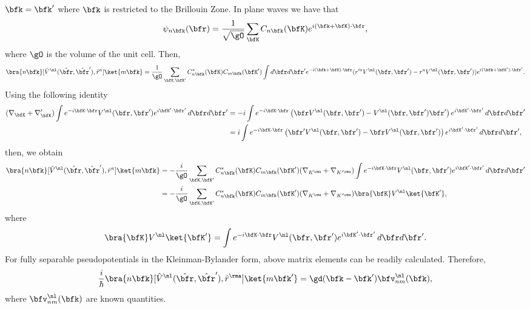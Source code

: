 $\bfk=\bfk'$ where $\bfk$ is restricted to the Brillouin Zone.
In plane waves we have that
\begin{align}\label{cn3}
\psi_{n\bfk}(\bfr)=\frac{1}{\sqrt{\gO}}
\sum_{\bfK} C_{n\bfk}(\bfK)e^{i(\bfk+\bfK)\cdot\bfr}
,
\end{align}
where $\gO$ is the volume of the unit cell.
Then,
\begin{align}\label{cn4}
\bra{n\bfk}[\hat V^\nl(\hat\bfr,\hat\bfr'),\hat r^a]\ket{m\bfk}
&=
\frac{1}{\gO}
\sum_{\bfK,\bfK'} 
C^*_{n\bfk}(\bfK) 
C_{m\bfk}(\bfK')
\int d\bfr d\bfr' 
e^{-i(\bfk+\bfK)\cdot \bfr}
 ( 
r'^a V^\nl(\bfr,\bfr')
- 
r^aV^\nl(\bfr,\bfr')
) 
e^{i(\bfk+\bfK')\cdot \bfr'}
.
\nonumber\\
\end{align} 
Using the following identity 
\begin{align}\label{cn51}
(\nabla_\bfK+\nabla_\bfK')
\int e^{-i\bfK\cdot\bfr}
V^\nl(\bfr,\bfr')
e^{i\bfK'\cdot\bfr'}
\,d\bfr d\bfr'
&=
-i
\int e^{-i\bfK\cdot\bfr}
\left(
\bfr
V^\nl(\bfr,\bfr')
-
V^\nl(\bfr,\bfr')
\bfr'
\right)
e^{i\bfK'\cdot\bfr'}
\,d\bfr d\bfr'
\nonumber\\
&=
i
\int e^{-i\bfK\cdot\bfr}
\left(
\bfr'
V^\nl(\bfr,\bfr')
-
\bfr
 V^\nl(\bfr,\bfr')
\right)
e^{i\bfK'\cdot\bfr'}
\,d\bfr d\bfr'
,
\nonumber\\
\end{align}
then, we obtain
\begin{align}\label{cn52}
\bra{n\bfk}[\hat V^\nl(\hat\bfr,\hat\bfr'),\hat r^a]\ket{m\bfk}
&=
-\frac{i}{\gO}
\sum_{\bfK,\bfK'}
C^*_{n\bfk}(\bfK)
C_{m\bfk}(\bfK')
(\nabla_{K^\rma}+\nabla_{K'^\rma})
\int e^{-i\bfK\cdot\bfr}
V^\nl(\bfr,\bfr')
e^{i\bfK'\cdot\bfr'}
\,d\bfr d\bfr'
\nonumber\\
&=
-\frac{i}{\gO}
\sum_{\bfK,\bfK'}
C^*_{n\bfk}(\bfK)
C_{m\bfk}(\bfK')
(\nabla_{K^\rma}+\nabla_{K'^\rma})
\bra{\bfK} 
V^\nl
\ket{\bfK'} 
,
\end{align}
where
\begin{align}\label{cn6}
\bra{\bfK} 
V^\nl
\ket{\bfK'} 
=
\int e^{-i\bfK\cdot\bfr}
V^\nl(\bfr,\bfr')
e^{i\bfK'\cdot\bfr'}
\,d\bfr d\bfr'
.
\end{align}
For fully  separable pseudopotentials in the 
Kleinman-Bylander form,\cite{motta_implementation_2010,kleinman_efficacious_1982,adolph_nonlocality_1996}
above matrix elements 
can be readily calculated.\cite{francesco}
Therefore,
\begin{align}\label{cn8}
\frac{i}{\hbar}
\bra{n\bfk}[\hat V^\nl(\hat\bfr,\hat\bfr'),\hat r^\rma]\ket{m\bfk'}
=\gd(\bfk-\bfk') \bfv^\nl_{nm}(\bfk)
,
\end{align}
where $\bfv^\nl_{nm}(\bfk)$ are known quantities.

